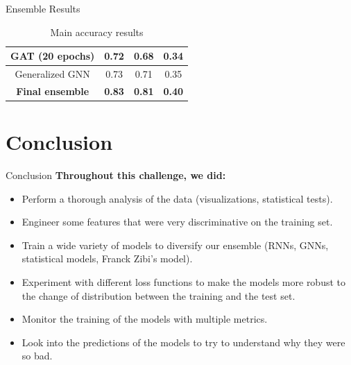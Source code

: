 \documentclass{beamer}
\begin{document}
\begin{frame}{Ensemble Results}
\begin{table}[H]
\begin{center}
{\begin{tabular}{|c|c|c|c|}
                    GAT (20 epochs)            & 0.72                   & 0.68                     & 0.34               \\
                    \hline
                    Generalized GNN            & 0.73                   & 0.71                     & 0.35               \\
                    \hline
                    \textbf{Final ensemble}    & \textbf{0.83}          & \textbf{0.81}            & \textbf{0.40}      \\
                    \hline
                \end{tabular}
            }
        \end{center}
        \caption{Main accuracy results}
        \label{tab:results}
    \end{table}
\end{frame}
\section{Conclusion}
\begin{frame}{Conclusion}
    \textbf{Throughout this challenge, we did:}
    \begin{itemize}
        \item Perform a thorough analysis of the data (visualizations, statistical tests).
        \item Engineer some features that were very discriminative on the training set.
        \item Train a wide variety of models to diversify our ensemble (RNNs, GNNs, statistical models, Franck Zibi's model).
        \item Experiment with different loss functions to make the models more robust to the change of distribution between the training and the test set.
        \item Monitor the training of the models with multiple metrics.
        \item Look into the predictions of the models to try to understand why they were so bad.
    \end{itemize}
\end{frame}
\end{document}
